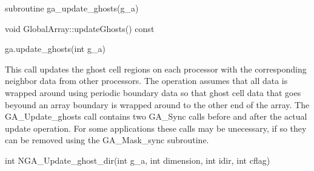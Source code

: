 \documentclass[10pt]{article}
\begin{document}
\begin{fapi}
\begin{fcode}
subroutine ga_update_ghosts(g_a)
\end{fcode}
\begin{funcargs}
\end{funcargs}
\end{fapi}

\begin{cxxapi}
\begin{cxxcode}
void GlobalArray::updateGhosts() const
\end{cxxcode}
\end{cxxapi}

\begin{pyapi}
\begin{pycode}
ga.update_ghosts(int g_a)
\end{pycode}
\begin{funcargs}
\end{funcargs}
\end{pyapi}

\gcoll

\begin{desc}

This call updates the ghost cell regions on each processor with the
corresponding neighbor data from other processors. The operation assumes that
all data is wrapped around using periodic boundary data so that ghost cell data
that goes beyound an array boundary is wrapped around to the other end of the
array. The GA_Update_ghosts call contains two GA_Sync calls before and after
the actual update operation. For some applications these calls may be
unecessary, if so they can be removed using the GA_Mask_sync subroutine.

\end{desc}


\begin{capi}
\begin{ccode}
int NGA_Update_ghost_dir(int g_a, int dimension, int idir, int cflag)
\end{ccode}
\begin{funcargs}
\end{funcargs}
\end{capi}
\end{document}
